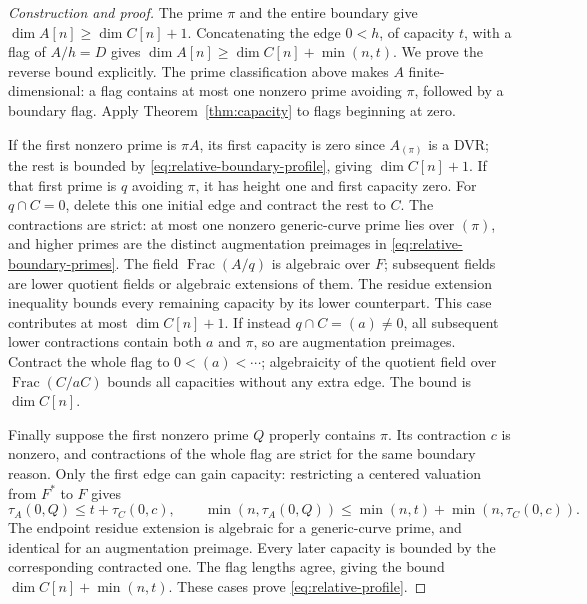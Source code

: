\documentclass[11pt,reqno]{amsart}
\numberwithin{equation}{section}
\theoremstyle{plain}
\theoremstyle{definition}
\theoremstyle{remark}
\begin{document}
\begin{proof}[Construction and proof]
The prime \(\pi\) and the entire boundary give
\(\dim A[n]\ge\dim C[n]+1\).  Concatenating the edge
\(0<h\), of capacity \(t\), with a flag of \(A/h=D\)
gives \(\dim A[n]\ge\dim C[n]+\min(n,t)\).
We prove the reverse bound explicitly.  The prime classification
above makes \(A\) finite-dimensional: a flag contains at most
one nonzero prime avoiding \(\pi\), followed by a boundary
flag.  Apply Theorem~\ref{thm:capacity} to flags beginning at zero.

If the first nonzero prime is \(\pi A\), its first capacity
is zero since \(A_{(\pi)}\) is a DVR; the rest is bounded by
\eqref{eq:relative-boundary-profile}, giving \(\dim C[n]+1\).
If that first prime is \(q\) avoiding \(\pi\), it has height
one and first capacity zero.  For \(q\cap C=0\), delete this
one initial edge and contract the rest to \(C\).  The
contractions are strict: at most one nonzero generic-curve
prime lies over \((\pi)\), and higher primes are the distinct
augmentation preimages in \eqref{eq:relative-boundary-primes}.
The field \(\operatorname{Frac}(A/q)\) is algebraic over
\(F\); subsequent fields are lower quotient fields or
algebraic extensions of them.  The residue extension inequality
bounds every remaining capacity by its lower counterpart.  This
case contributes at most \(\dim C[n]+1\).  If instead
\(q\cap C=(a)\ne0\), all subsequent lower contractions
contain both \(a\) and \(\pi\), so are augmentation preimages.
Contract the whole flag to \(0<(a)<\cdots\); algebraicity of
the quotient field over \(\operatorname{Frac}(C/aC)\) bounds
all capacities without any extra edge.  The bound is \(\dim C[n]\).

Finally suppose the first nonzero prime \(Q\) properly contains
\(\pi\).  Its contraction \(c\) is nonzero, and contractions
of the whole flag are strict for the same boundary reason.
Only the first edge can gain capacity: restricting a centered
valuation from \(F^*\) to \(F\) gives
\[
 \tau_A(0,Q)\le t+\tau_C(0,c),\qquad
 \min(n,\tau_A(0,Q))
 \le\min(n,t)+\min(n,\tau_C(0,c)).
\]
The endpoint residue extension is algebraic for a generic-curve
prime, and identical for an augmentation preimage.  Every later
capacity is bounded by the corresponding contracted one.  The
flag lengths agree, giving the bound \(\dim C[n]+\min(n,t)\).
These cases prove \eqref{eq:relative-profile}.


\end{proof}
\end{document}
